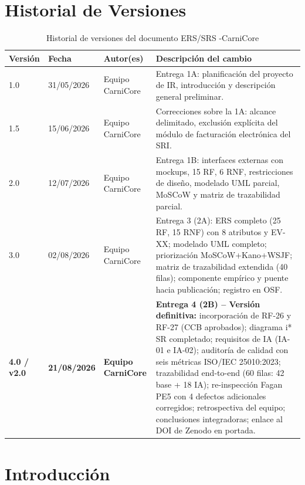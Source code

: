 \documentclass[11pt,a4paper]{article}
\begin{document}
\section*{Historial de Versiones}
\begin{longtable}{|p{1.5cm}|p{2.2cm}|p{3cm}|p{8cm}|}
\caption{Historial de versiones del documento ERS/SRS -CarniCore}\\
\hline
\textbf{Versión} & \textbf{Fecha} & \textbf{Autor(es)} & \textbf{Descripción del cambio} \\
\hline
1.0 & 31/05/2026 & Equipo CarniCore & Entrega 1A: planificación del proyecto de IR, introducción y descripción general preliminar. \\
\hline
1.5 & 15/06/2026 & Equipo CarniCore & Correcciones sobre la 1A: alcance delimitado, exclusión explícita del módulo de facturación electrónica del SRI. \\
\hline
2.0 & 12/07/2026 & Equipo CarniCore & Entrega 1B: interfaces externas con mockups, 15 RF, 6 RNF, restricciones de diseño, modelado UML parcial, MoSCoW y matriz de trazabilidad parcial. \\
\hline
3.0 & 02/08/2026 & Equipo CarniCore & Entrega 3 (2A): ERS completo (25 RF, 15 RNF) con 8 atributos y EV-XX; modelado UML completo; priorización MoSCoW+Kano+WSJF; matriz de trazabilidad extendida (40 filas); componente empírico y puente hacia publicación; registro en OSF. \\
\hline
\textbf{4.0 / v2.0} & \textbf{21/08/2026} & \textbf{Equipo CarniCore} & \textbf{Entrega 4 (2B) -- Versión definitiva:} incorporación de RF-26 y RF-27 (CCB aprobados); diagrama i* SR completado; requisitos de IA (IA-01 e IA-02); auditoría de calidad con seis métricas ISO/IEC 25010:2023; trazabilidad end-to-end (60 filas: 42 base + 18 IA); re-inspección Fagan PE5 con 4 defectos adicionales corregidos; retrospectiva del equipo; conclusiones integradoras; enlace al DOI de Zenodo en portada. \\
\hline
\end{longtable}

\renewcommand{\contentsname}{\'{I}ndice}
\renewcommand{\listtablename}{\'{I}ndice de Tablas}
\renewcommand{\listfigurename}{\'{I}ndice de Figuras}

\newpage
\tableofcontents
\newpage
\listoftables
\newpage
\listoffigures
\newpage

\section{Introducción}
\end{document}
